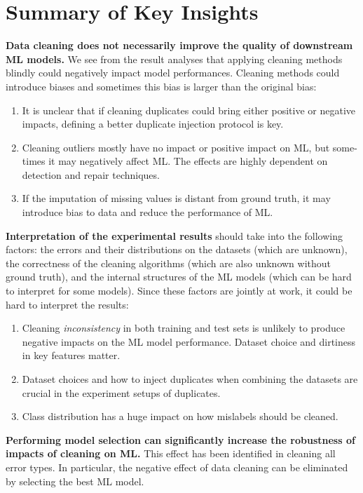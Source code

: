 \section{Summary of Key Insights} \label{sec:summary-of-key-insights}

\textbf{Data cleaning does not necessarily improve the quality of downstream ML models.} We see from the result analyses that
applying cleaning methods blindly could negatively impact model performances. 
Cleaning methods could introduce biases and sometimes this bias is larger than the original bias:

\begin{enumerate}
	\item {
		It is unclear that if cleaning duplicates could bring either positive or negative impacts,
		defining a better duplicate injection protocol is key.
	}
	\item {
		Cleaning outliers mostly have no impact or positive impact on ML, but some-
		times it may negatively affect ML. The effects are highly dependent
		on detection and repair techniques.	
	} 
	\item {
		If the imputation of missing values is distant from ground truth, it may introduce bias to data
		and reduce the performance of ML.
	}
\end{enumerate}

\textbf{Interpretation of the experimental results} should take into the following factors: the errors and their distributions on the datasets (which are unknown), the correctness of the cleaning algorithms (which are also unknown without ground truth), and the internal structures of the ML models (which can be hard to interpret for some models). Since these factors are jointly at work, it could be hard to interpret the results:

\begin{enumerate}
	\item {
		Cleaning \textit{inconsistency} in both training and test sets is unlikely to produce negative impacts on the ML model performance. Dataset choice and dirtiness in key features matter.
	}
	\item {
		Dataset choices and how to inject duplicates when combining the datasets are crucial in the experiment setups of duplicates.
	}
	\item {
		Class distribution has a huge impact on how mislabels
		should be cleaned.
	} 
\end{enumerate}

\textbf{Performing model selection can significantly increase the robustness of impacts of cleaning on ML.} This effect has been identified in cleaning all error types. In particular, the negative effect of
data cleaning can be eliminated by selecting the best ML model.

